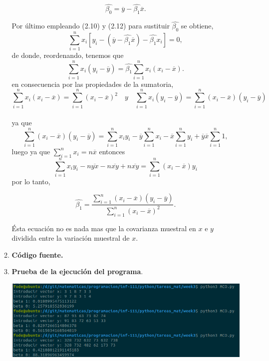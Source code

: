 \begin{enumerate}
\begin{enumerate}[\bfseries a)]
\begin{tcolorbox}[colframe=white]
\begin{equation}
    \hat{\beta_0} = \overline{y} - \hat{\beta_1}\overline{x}.
\end{equation}
\end{tcolorbox}
Por último empleando (2.10) y (2.12) para sustituir $\hat{\beta_0}$ se obtiene,
$$\sum_{i=1}^n x_i\left[y_i-(\overline{y}-\hat{\beta_1}\overline{x})-\hat{\beta_1}x_i\right] = 0,$$
de donde, reordenando, tenemos que
$$\sum_{i=1}^n x_i(y_i-\overline{y}) = \hat{\beta_1}\sum_{i=1}^n x_i(x_i-\overline{x}).$$
en consecuencia por las propiedades de la sumatoria, 
$$\sum_{i=1}^n x_i(x_i-\overline{x}) = \sum_{i=1}^n (x_i-\overline{x})^2 \quad y \quad \sum_{i=1}^n x_i(y_i-\overline{y}) = \sum_{i=1}^n (x_i-\overline{x})(y_i-\overline{y})$$\\
ya que $$\sum\limits_{i=1}^n (x_i-\overline{x})(y_i-\overline{y})=\sum\limits_{i=1}^n x_i y_i - \overline{y}\sum\limits_{i=1}^n x_i - \overline{x}\sum\limits_{i=1}^n y_i + \overline{y} \overline{x}\sum\limits_{i=1}^n 1,$$ luego ya que $\sum\limits_{i=1}^n x_i = n\overline{x}$ entonces $$\sum\limits_{i=1}^n x_iy_i - n\overline{yx} - n\overline{xy} + n\overline{xy} = \sum\limits_{i=1}^n (x_i-\overline{x})y_i$$
por lo tanto, 
\begin{tcolorbox}[colframe=white]
\begin{equation}
    \hat{\beta_1} = \frac{\sum\limits_{i=1}^n (x_i-\overline{x})(y_i-\overline{y})}{\sum\limits_{i=1}^n (x_i-\overline{x})^2}.
\end{equation}
\end{tcolorbox}
Ésta ecuación no es nada mas que la covarianza muestral en $x$ e $y$ dividida entre la variación muestral de $x$.

\newpage

	\item \textbf{Código fuente.}\\ 
	    
	    
	    \vspace{1cm}
	
	\item \textbf{Prueba de la ejecución del programa}.\\
	    \begin{center}
		\includegraphics[scale=.5]{imagenes/tareas_mat/week3/MCO.png}
	    \end{center}


\end{enumerate}
\end{enumerate}
